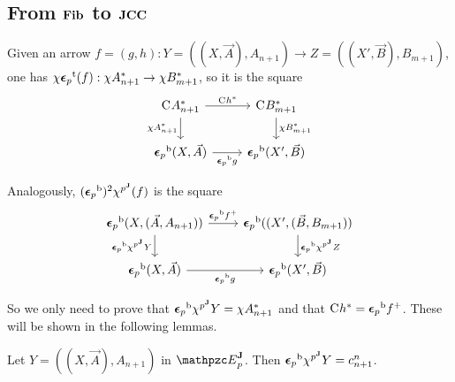 \documentclass{lmcs} %
\theoremstyle{plain}\newtheorem{satz}[thm]{Satz} %
\begin{document}
\subsection{From $\mathbf{Fib}$ to $\mathbf{JCC}$}
\begin{rem}\label{rmk:lemma}
	Given an arrow $f=(g,h):Y=((X,\vec{A}), A_{n+1})\rightarrow Z=((X', \vec{B}), B_{m+1})$, one has $\chi{\boldsymbol{\epsilon}_p}^{\mathrm{t}}(f): \chi A_{n+1}^*\rightarrow \chi B_{m+1}^*$, so it is the square
	\[\begin{tikzcd}
		{\comp{} A_{n+1}^*} & {\comp{} B_{m+1}^*} \\
		{\fb{\twont{\epsilon}_p}(X,\vec{A})} & {\fb{\twont{\epsilon}_p}(X',\vec{B})}
		\arrow["{\comp{} h^*}", from=1-1, to=1-2]
		\arrow["{\chi A_{n+1}^*}"', from=1-1, to=2-1]
		\arrow["{\chi B_{m+1}^*}", from=1-2, to=2-2]
		\arrow["\fb{\twont{\epsilon}_p}g"', from=2-1, to=2-2]
	\end{tikzcd}\]
	
	Analogously, $({\boldsymbol{\epsilon}_p}^{\mathrm{b}})^{2}\chi^{{p}^{\mathbf{J}}}(f)$ is the square 
	\[\begin{tikzcd}
		{\fb{\twont{\epsilon}_p}(X,(\vec{A},A_{n+1}))} & {\fb{\twont{\epsilon}_p}((X',(\vec{B},B_{m+1}))} \\
		{\fb{\twont{\epsilon}_p}(X,\vec{A})} & {\fb{\twont{\epsilon}_p}(X',\vec{B})}
		\arrow["{\fb{\twont{\epsilon}_p}\carr{f}}", from=1-1, to=1-2]
		\arrow["{\fb{\twont{\epsilon}_p}\JFC{p} Y}"', from=1-1, to=2-1]
		\arrow["{\fb{\twont{\epsilon}_p}\JFC{p} Z}", from=1-2, to=2-2]
		\arrow["\fb{\twont{\epsilon}_p}g"', from=2-1, to=2-2]
	\end{tikzcd}\]
\end{rem}

So we only need to prove that ${\boldsymbol{\epsilon}_p}^{\mathrm{b}}\chi^{{p}^{\mathbf{J}}} Y=\chi A_{n+1}^*$ and that $\mathrm{C}^{} h^*={\boldsymbol{\epsilon}_p}^{\mathrm{b}}f^+$. These will be shown in the following lemmas.

\begin{lem}\label{lem:jcoun1}
	Let $Y=((X,\vec{A}), A_{n+1})$ in $\JDomE{p}$. Then ${\boldsymbol{\epsilon}_p}^{\mathrm{b}}\chi^{{p}^{\mathbf{J}}} Y=c^{n}_{n+1}$.
\end{lem}
\end{document}
